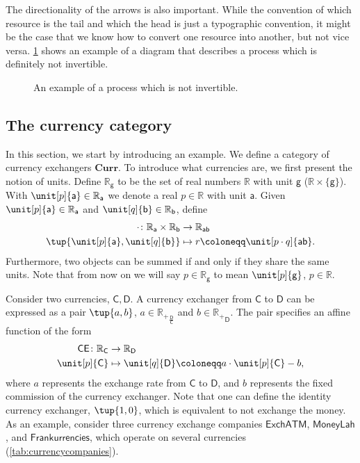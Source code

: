 The directionality of the arrows is also important. While the convention of
which resource is the tail and which the head is just a typographic convention,
it might be the case that we know how to convert one resource into another, but
not vice versa. \cref{fig:e10} shows an example of a diagram that describes a process which is definitely
not invertible.

\begin{figure}[h!]
    \centering
    \caption{An example of a process which is not invertible. \label{fig:e10}}
\end{figure}

\subsection{The currency category}
In this section, we start by introducing an example. We define a category of currency exchangers $\mathbf{Curr}$. To introduce what currencies are, we first present the notion of units. Define $\mathbb{R}_\mathsf{g}$ to be the set of real numbers $\mathbb{R}$ with unit $\mathsf{g}$ ($\mathbb{R}\times \{\mathsf{g}\}$). With $\unit[p]{\mathsf{a}}\in \mathbb{R}_\mathsf{a}$ we denote a real $p\in \mathbb{R}$ with unit $\mathsf{a}$. Given $\unit[p]{\mathsf{a}} \in \mathbb{R}_\mathsf{a}$ and $\unit[q]{\mathsf{b}}\in \mathbb{R}_\mathsf{b}$, define
    \begin{equation}
    \begin{aligned}
    \cdot \colon \mathbb{R}_\mathsf{a} \times \mathbb{R}_\mathsf{b} &\to \mathbb{R}_\mathsf{ab}\\
    \tup{\unit[p]{\mathsf{a}},\unit[q]{\mathsf{b}}}&\mapsto r\coloneqq \unit[p\cdot q]{\mathsf{ab}}.
    \end{aligned}
    \end{equation}
Furthermore, two objects can be summed if and only if they share the same units. Note that from now on we will say $p\in \mathbb{R}_\mathsf{g}$ to mean $\unit[p]{\mathsf{g}}$, $p\in \mathbb{R}$.

\noindent Consider two currencies, $\mathsf{C,D}$. A currency exchanger from $\mathsf{C}$ to $\mathsf{D}$ can be expressed as a pair $\tup{a,b}$, $a\in {\mathbb{R}_{+}}_ {\frac{\mathsf{D}}{\mathsf{C}}}$ and $b\in {\mathbb{R}_{+}}_ {\mathsf{D}}$. The pair specifies an affine function of the form
\begin{equation}
        \begin{aligned}
        \mathsf{CE}\colon \mathbb{R}_\mathsf{C}&\to \mathbb{R}_\mathsf{D}\\
        \unit[p]{\mathsf{C}}&\mapsto \unit[q]{\mathsf{D}} \coloneqq a\cdot \unit[p]{\mathsf{C}} -b,
        \end{aligned}
    \end{equation}
   where $a$ represents the exchange rate from $\mathsf{C}$ to $\mathsf{D}$, and $b$ represents the fixed commission of the currency exchanger. Note that one can define the identity currency exchanger, $\tup{1,0}$, which is equivalent to not exchange the money. As an example, consider three currency exchange companies $\mathsf{ExchATM}$, $\mathsf{MoneyLah}$, and $\mathsf{Frankurrencies}$, which operate on several currencies (\cref{tab:currencycompanies}).
   
